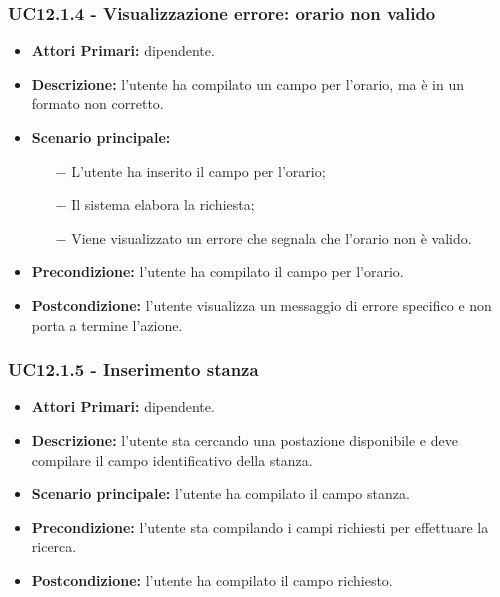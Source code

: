 \subsubsection{ UC12.1.4 - Visualizzazione errore: orario non valido }
\begin{itemize}
	\item\textbf{Attori Primari:} dipendente.
	\item\textbf{Descrizione:} l’utente ha compilato un campo per l'orario, ma è in un formato non corretto.
	\item\textbf{Scenario principale:} 
	\begin{itemize}
		\item[$-$] L’utente ha inserito il campo per l'orario;
		\item[$-$] Il sistema elabora la richiesta;
		\item[$-$] Viene visualizzato un errore che segnala che l'orario non è valido.
	\end{itemize}
	\item\textbf{Precondizione:} l’utente ha compilato il campo per l'orario.
	\item\textbf{Postcondizione:} l’utente visualizza un messaggio di errore specifico e non porta a termine l’azione.
\end{itemize}
\subsubsection{ UC12.1.5 - Inserimento stanza }
\begin{itemize}
	\item\textbf{Attori Primari:} dipendente.
	\item\textbf{Descrizione:} l’utente sta cercando una postazione disponibile e deve compilare il campo identificativo della stanza.
	\item\textbf{Scenario principale:} l’utente ha compilato il campo stanza.
	\item\textbf{Precondizione:} l’utente sta compilando i campi richiesti per effettuare la ricerca.
	\item\textbf{Postcondizione:} l’utente ha compilato il campo richiesto.
\end{itemize}
